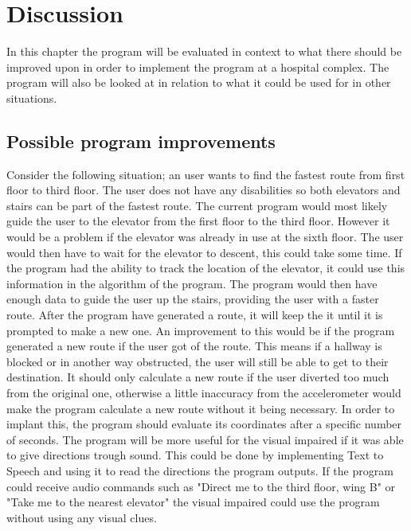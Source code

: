 \chapter{Discussion}

In this chapter the program will be evaluated in context to what there should be improved upon in order to implement the program at a hospital complex. The program will also be looked at in relation to what it could be used for in other situations.

\section{Possible program improvements}

Consider the following situation; an user wants to find the fastest route from first floor to third floor. The user does not have any disabilities so both elevators and stairs can be part of the fastest route. The current program would most likely guide the user to the elevator from the first floor to the third floor. However it would be a problem if the elevator was already in use at the sixth floor. The user would then have to wait for the elevator to descent, this could take some time. If the program had the ability to track the location of the elevator, it could use this information in the algorithm of the program. The program would then have enough data to guide the user up the stairs, providing the user with a faster route. 
\newline
After the program have generated a route, it will keep the it until it is prompted to make a new one. An improvement to this would be if the program generated a new route if the user got of the route. This means if a hallway is blocked or in another way obstructed, the user will still be able to get to their destination. It should only calculate a new route if the user diverted too much from the original one, otherwise a little inaccuracy from the accelerometer would make the program calculate a new route without it being necessary. In order to implant this, the program should evaluate its coordinates after a specific number of seconds.
The program will be more useful for the visual impaired if it was able to give directions trough sound. This could be done by implementing Text to Speech\cite{diss_tss} and using it to read the directions the program outputs. If the program could receive audio commands such as "Direct me to the third floor, wing B" or "Take me to the nearest elevator" the visual impaired could use the program without using any visual clues.

